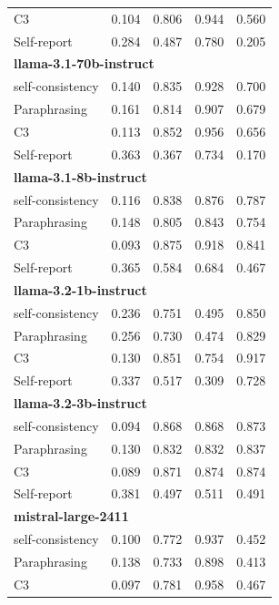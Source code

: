 \documentclass[11pt]{article}
\theoremstyle{plain}
\theoremstyle{definition}
\theoremstyle{remark}
\begin{document}
\begin{table}[p]
\begin{minipage}[t]{0.48\textwidth}
\begin{tabular}{lcccc}
       C3             & 0.104 & 0.806 & 0.944 & 0.560 \\
        Self-report      & 0.284 & 0.487 & 0.780 & 0.205 \\
        \midrule
        \multicolumn{5}{l}{\textbf{llama-3.1-70b-instruct}} \\
        self-consistency & 0.140 & 0.835 & 0.928 & 0.700 \\
        Paraphrasing     & 0.161 & 0.814 & 0.907 & 0.679 \\
       C3             & 0.113 & 0.852 & 0.956 & 0.656 \\
        Self-report      & 0.363 & 0.367 & 0.734 & 0.170 \\
        \midrule
        \multicolumn{5}{l}{\textbf{llama-3.1-8b-instruct}} \\
        self-consistency & 0.116 & 0.838 & 0.876 & 0.787 \\
        Paraphrasing     & 0.148 & 0.805 & 0.843 & 0.754 \\
       C3             & 0.093 & 0.875 & 0.918 & 0.841 \\
        Self-report      & 0.365 & 0.584 & 0.684 & 0.467 \\
        \midrule
        \multicolumn{5}{l}{\textbf{llama-3.2-1b-instruct}} \\
        self-consistency & 0.236 & 0.751 & 0.495 & 0.850 \\
        Paraphrasing     & 0.256 & 0.730 & 0.474 & 0.829 \\
       C3             & 0.130 & 0.851 & 0.754 & 0.917 \\
        Self-report      & 0.337 & 0.517 & 0.309 & 0.728 \\
        \midrule
        \multicolumn{5}{l}{\textbf{llama-3.2-3b-instruct}} \\
        self-consistency & 0.094 & 0.868 & 0.868 & 0.873 \\
        Paraphrasing     & 0.130 & 0.832 & 0.832 & 0.837 \\
       C3             & 0.089 & 0.871 & 0.874 & 0.874 \\
        Self-report      & 0.381 & 0.497 & 0.511 & 0.491 \\
        \midrule
        \multicolumn{5}{l}{\textbf{mistral-large-2411}} \\
        self-consistency & 0.100 & 0.772 & 0.937 & 0.452 \\
        Paraphrasing     & 0.138 & 0.733 & 0.898 & 0.413 \\
       C3             & 0.097 & 0.781 & 0.958 & 0.467 \\

\end{tabular}
\end{minipage}
\end{table}
\end{document}
